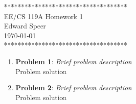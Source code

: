 \documentclass{article}
\newcommand{\HWNUM}{1}
\begin{document}

    \begin{center}
        ************************************ \\
        EE/CS 119A Homework \HWNUM \\
        Edward Speer \\
        \today \\
        ************************************
    \end{center}

    \begin{enumerate}
    
        \item \textbf{Problem 1}: \emph{Brief problem description} \\
            Problem solution

        \item \textbf{Problem 2}: \emph{Brief problem description} \\
            Problem solution

    \end{enumerate}
\end{document}
